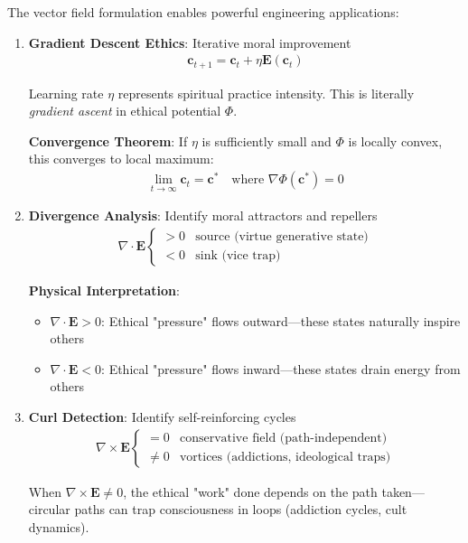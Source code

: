 \documentclass[11pt,a4paper]{article}
\theoremstyle{definition}
\theoremstyle{remark}
\newcommand{\EE}{\mathbf{E}}
\newcommand{\cc}{\mathbf{c}}
\begin{document}
\begin{small}
The vector field formulation enables powerful engineering applications:

\begin{enumerate}[leftmargin=*]
\item \textbf{Gradient Descent Ethics}: Iterative moral improvement
\begin{align}
\cc_{t+1} = \cc_t + \eta \EE(\cc_t)
\end{align}

Learning rate \(\eta\) represents spiritual practice intensity. This is literally \textit{gradient ascent} in ethical potential \(\Phi\).

\textbf{Convergence Theorem}: If \(\eta\) is sufficiently small and \(\Phi\) is locally convex, this converges to local maximum:
\begin{align}
\lim_{t \to \infty} \cc_t = \cc^* \quad \text{where } \nabla \Phi(\cc^*) = 0
\end{align}

\item \textbf{Divergence Analysis}: Identify moral attractors and repellers
\begin{align}
\nabla \cdot \EE \begin{cases}
    > 0 & \text{source (virtue generative state)} \\
    < 0 & \text{sink (vice trap)}
\end{cases}
\end{align}

\textbf{Physical Interpretation}: 
\begin{itemize}
    \item \(\nabla \cdot \EE > 0\): Ethical "pressure" flows outward—these states naturally inspire others
    \item \(\nabla \cdot \EE < 0\): Ethical "pressure" flows inward—these states drain energy from others
\end{itemize}

\item \textbf{Curl Detection}: Identify self-reinforcing cycles
\begin{align}
\nabla \times \EE \begin{cases}
    = 0 & \text{conservative field (path-independent)} \\
    \neq 0 & \text{vortices (addictions, ideological traps)}
\end{cases}
\end{align}

When \(\nabla \times \EE \neq 0\), the ethical "work" done depends on the path taken—circular paths can trap consciousness in loops (addiction cycles, cult dynamics).


\end{enumerate}
\end{small}
\end{document}
